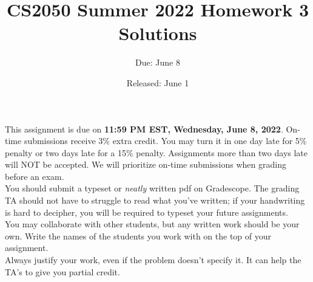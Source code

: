 \documentclass{article}
\title{CS2050 Summer 2022 Homework 3 Solutions}
\author{Due: June 8}
\date{Released: June 1}
\begin{document}
\maketitle

This assignment is due on \textbf{11:59 PM EST, Wednesday, June 8, 2022}.  On-time submissions receive 3\% extra credit. You may turn it in one day late for 5\% penalty or two days late for a 15\% penalty. Assignments more than two days late will NOT be accepted.  We will prioritize on-time submissions when grading before an exam. \\ 

You should submit a typeset or \emph{neatly} written pdf on Gradescope.  The grading TA should not have to struggle to read what you've written; if your handwriting is hard to decipher, you will be required to typeset your future assignments.\\ 

You may collaborate with other students, but any written work should be your own. Write the names of the students you work with on the top of your assignment.\\

Always justify your work, even if the problem doesn't specify it. It can help the TA's to give you partial credit.
\end{document}
